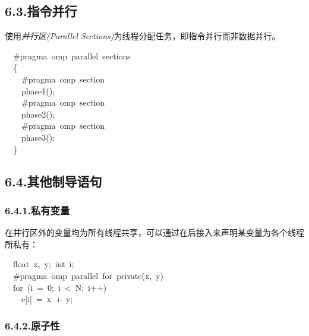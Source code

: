 \documentclass{article}
\begin{document}
\subsection{6.3.\hspace*{0.5em}指令并行}\label{section}%

\noindent{}使用\emph{并行区(Parallel Sections)}为线程分配任务，即指令并行而非数据并行。%
\begin{mdpre}%
\noindent~~\#pragma~omp~parallel~sections\\
~~\{\\
~~~~\#pragma~omp~section\\
~~~~phase1();\\
~~~~\#pragma~omp~section\\
~~~~phase2();\\
~~~~\#pragma~omp~section\\
~~~~phase3();\\
~~\}%
\end{mdpre}
\subsection{6.4.\hspace*{0.5em}其他制导语句}\label{section}%

\subsubsection{6.4.1.\hspace*{0.5em}私有变量}\label{section}%

\noindent{}在并行区外的变量均为所有线程共享，可以通过在后接入来声明某变量为各个线程所私有：%
\begin{mdpre}%
\noindent~~{float}~x,~y;~{int}~i;\\
~~\#pragma~omp~parallel~{for}~{private}(x,~y)\\
~~{for}~(i~=~{0};~i~\textless{}~{N};~i++)\\
~~~~c[i]~=~x~+~y;%
\end{mdpre}
\subsubsection{6.4.2.\hspace*{0.5em}原子性}\label{section}%
\end{document}
